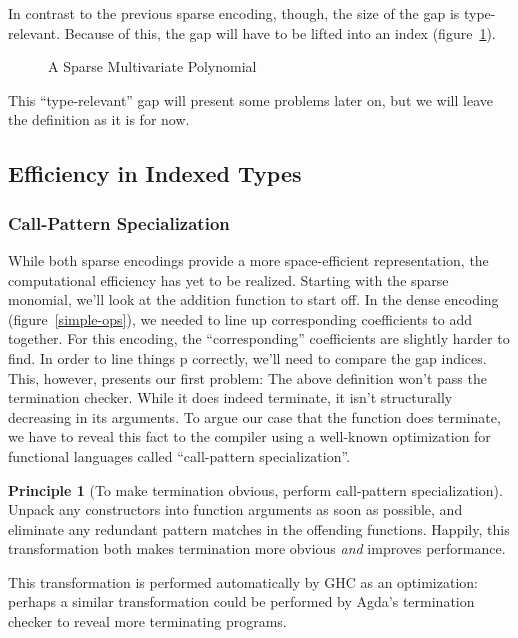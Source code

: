 \documentclass[draft, twocolumn]{article}
\theoremstyle{definition}
\theoremstyle{definition}
\newtheorem{principle}{Principle}[section]
\begin{document}
In contrast to the previous sparse encoding, though, the size of the gap is
type-relevant. Because of this, the gap will have to be lifted into an index
(figure~\ref{sparse-poly}).
\begin{figure}
  \caption{A Sparse Multivariate Polynomial}
  \label{sparse-poly}
\end{figure}

This ``type-relevant'' gap will present some problems later on, but we will
leave the definition as it is for now.
\subsection{Efficiency in Indexed Types}
\subsubsection{Call-Pattern Specialization}
While both sparse encodings provide a more space-efficient representation, the
computational efficiency has yet to be realized. Starting with the sparse
monomial, we'll look at the addition function to start off. In the dense
encoding (figure~\ref{simple-ops}), we needed to line up corresponding
coefficients to add together. For this encoding, the ``corresponding''
coefficients are slightly harder to find. In order to line things p correctly,
we'll need to compare the gap indices. This, however, presents our first
problem:
The above definition won't pass the termination checker. While it does indeed
terminate, it isn't structurally decreasing in its arguments. To argue our case
that the function does terminate, we have to reveal this fact to the compiler
using a well-known optimization for functional languages called ``call-pattern
specialization''\cite{jones_call-pattern_2007}.
\begin{principle}[To make termination obvious, perform call-pattern
    specialization]
  Unpack any constructors into function arguments as soon as possible, and
  eliminate any redundant pattern matches in the offending functions. Happily,
  this transformation both makes termination more obvious \emph{and} improves
  performance.

  This transformation is performed automatically by GHC as an optimization:
  perhaps a similar transformation could be performed by Agda's termination
  checker to reveal more terminating programs.
\end{principle}
\end{document}
